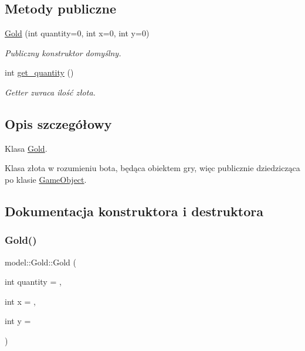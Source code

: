 \subsection*{Metody publiczne}
\begin{DoxyCompactItemize}
\item 
\hyperlink{classmodel_1_1Gold_af03300ab94b3c7ac512d01bc077e3b8c}{Gold} (int quantity=0, int x=0, int y=0)
\begin{DoxyCompactList}\small\item\em Publiczny konstruktor domyślny. \end{DoxyCompactList}\item 
\mbox{\label{classmodel_1_1Gold_a12dc623fc71413530868aff26f81981d}} 
int \hyperlink{classmodel_1_1Gold_a12dc623fc71413530868aff26f81981d}{get\+\_\+quantity} ()
\begin{DoxyCompactList}\small\item\em Getter zwraca ilość złota. \end{DoxyCompactList}\end{DoxyCompactItemize}


\subsection{Opis szczegółowy}
Klasa \hyperlink{classmodel_1_1Gold}{Gold}. 

Klasa złota w rozumieniu bota, będąca obiektem gry, więc publicznie dziedzicząca po klasie \hyperlink{classmodel_1_1GameObject}{Game\+Object}. 

\subsection{Dokumentacja konstruktora i destruktora}
\mbox{\label{classmodel_1_1Gold_af03300ab94b3c7ac512d01bc077e3b8c}} 
\subsubsection{\texorpdfstring{Gold()}{Gold()}}
{\footnotesize\ttfamily model\+::\+Gold\+::\+Gold (\begin{DoxyParamCaption}\item[{int}]{quantity = {},  }\item[{int}]{x = {},  }\item[{int}]{y = {} }\end{DoxyParamCaption})\hspace{0.3cm}{\ttfamily [inline]}}



